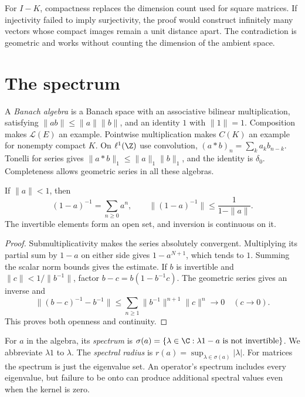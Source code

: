 \begin{beauty}
For $I-K$, compactness replaces the dimension count used for square matrices. If injectivity failed to imply surjectivity, the proof would construct infinitely many vectors whose compact images remain a unit distance apart. The contradiction is geometric and works without counting the dimension of the ambient space.
\end{beauty}

\section{The spectrum}

A \emph{Banach algebra} is a Banach space with an associative bilinear multiplication, satisfying $\|ab\|\le\|a\|\|b\|$, and an identity $1$ with $\|1\|=1$. Composition makes $\mathcal L(E)$ an example. Pointwise multiplication makes $C(K)$ an example for nonempty compact $K$. On $\ell^1(\Z)$ use convolution,
$(a*b)_n=\sum_ka_kb_{n-k}$.
Tonelli for series gives $\|a*b\|_1\le\|a\|_1\|b\|_1$, and the identity is $\delta_0$. Completeness allows geometric series in all these algebras.

\begin{lemma}\label{lem:neumann}
If $\|a\|<1$, then
\[
(1-a)^{-1}=\sum_{n\ge0}a^n,\qquad
\|(1-a)^{-1}\|\le\frac1{1-\|a\|}.
\]
The invertible elements form an open set, and inversion is continuous on it.
\end{lemma}
\begin{proof}
Submultiplicativity makes the series absolutely convergent. Multiplying its partial sum by $1-a$ on either side gives $1-a^{N+1}$, which tends to $1$. Summing the scalar norm bounds gives the estimate.
If $b$ is invertible and $\|c\|<1/\|b^{-1}\|$, factor $b-c=b(1-b^{-1}c)$. The geometric series gives an inverse and
\[
\|(b-c)^{-1}-b^{-1}\|
\le\sum_{n\ge1}\|b^{-1}\|^{n+1}\|c\|^n\longrightarrow0
\quad(c\to0).
\]
This proves both openness and continuity.
\end{proof}

For $a$ in the algebra, its \emph{spectrum} is
$\sigma(a)=\{\lambda\in\C:\lambda1-a\text{ is not invertible}\}$.
We abbreviate $\lambda1$ to $\lambda$. The \emph{spectral radius} is $r(a)=\sup_{\lambda\in\sigma(a)}|\lambda|$. For matrices the spectrum is just the eigenvalue set. An operator's spectrum includes every eigenvalue, but failure to be onto can produce additional spectral values even when the kernel is zero.

